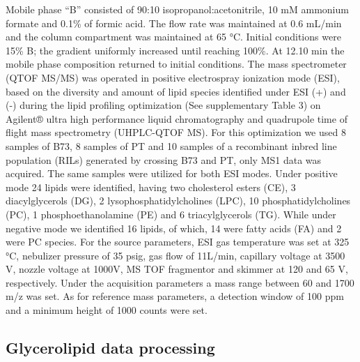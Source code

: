 \documentclass[9pt,twocolumn,twoside]{BioRxiv}
\begin{document}
Mobile phase “B” consisted of 90:10 isopropanol:acetonitrile, 10 mM ammonium formate and 0.1\% of formic acid. 
The flow rate was maintained at 0.6 mL/min and the column compartment was maintained at 65 °C. Initial conditions were 15\% B; the gradient uniformly increased until reaching 100\%. 
At 12.10 min the mobile phase composition returned to initial conditions.
The mass spectrometer (QTOF MS/MS) was operated in positive electrospray ionization mode (ESI), based on the diversity and amount of lipid species identified under ESI (+) and (-) during the lipid profiling optimization (See supplementary Table 3) on Agilent® ultra high performance liquid chromatography and quadrupole time of flight mass spectrometry (UHPLC-QTOF MS). 
For this optimization we used 8 samples of B73, 8 samples of PT and 10 samples of a recombinant inbred line population (RILs) generated by crossing B73 and PT, only MS1 data was acquired. 
The same samples were utilized for both ESI modes. 
Under positive mode 24 lipids were identified, having two cholesterol esters (CE), 3 diacylglycerols (DG), 2 lysophosphatidylcholines (LPC), 10 phosphatidylcholines (PC), 1 phosphoethanolamine (PE) and 6 triacylglycerols (TG). 
While under negative mode we identified 16 lipids, of which, 14 were fatty acids (FA) and 2 were PC species. 
For the source parameters, ESI gas temperature was set at 325 °C, nebulizer pressure of 35 psig, gas flow of 11L/min, capillary voltage at 3500 V, nozzle voltage at 1000V, MS TOF fragmentor and skimmer at 120 and 65 V, respectively.
Under the acquisition parameters a mass range between 60 and 1700 m/z was set. As for reference mass parameters, a detection window of 100 ppm and a minimum height of 1000 counts were set. 

\subsection{Glycerolipid data processing}
\end{document}
